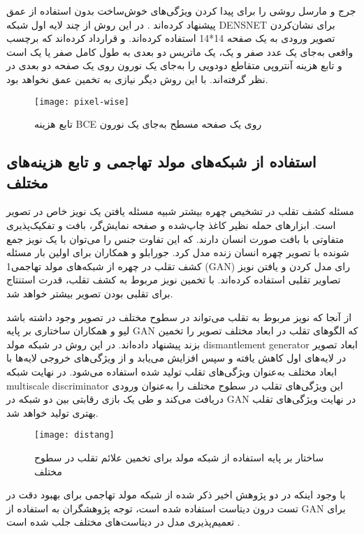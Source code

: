  جرج و مارسل روشی را برای پیدا کردن ویژگی‌های خوش‌ساخت بدون استفاده از عمق پیشنهاد کرده‌اند
 \cite{george2019deep}.
 در این روش از چند لایه اول شبکه DENSNET
\cite{huang2017densely}
برای نشان‌کردن تصویر ورودی به یک صفحه 14*14 استفاده کرده‌اند. و قرارداد کرده‌اند که برچسب واقعی به‌جای یک عدد صفر و یک، یک ماتریس دو بعدی به طول کامل صفر یا یک است و تابع هزینه آنتروپی متقاطع دودویی را به‌جای یک نورون روی یک صفحه دو بعدی در نظر گرفته‌اند. با این روش دیگر نیازی به تخمین عمق نخواهد بود.
\begin{figure}[h]
	\centerline{\texttt{[image: pixel-wise]}}
	\caption{تابع هزینه BCE روی یک صفحه مسطح به‌جای یک نورون \cite{george2019deep} }
	\label{fig:pixel-wise}
\end{figure}
\subsection{استفاده از شبکه‌های مولد تهاجمی و تابع هزینه‌های مختلف}
مسئله کشف تقلب در تشخیص چهره بیشتر شبیه مسئله یافتن یک نویز خاص در تصویر است. ابزارهای حمله نظیر کاغذ چاپ‌شده و صفحه نمایش‌گر، بافت و تفکیک‌پذیری متفاوتی با بافت صورت انسان دارند. که این تفاوت جنس را می‌توان با یک نویز جمع شونده با تصویر چهره انسان زنده مدل کرد. جورابلو و همکاران
\cite{jourabloo2018face}
برای اولین بار مسئله کشف تقلب در چهره از شبکه‌های مولد تهاجمی1 (GAN)
\cite{goodfellow2014generative}
رای مدل کردن و یافتن نویز تصاویر تقلبی استفاده کرده‌اند. با تخمین نویز مربوط به کشف تقلب، قدرت استنتاج برای تقلبی بودن تصویر بیشتر خواهد شد.

از آنجا که نویز مربوط به تقلب می‌تواند در سطوح مختلف در تصویر وجود داشته باشد لیو و همکاران
\cite{liu2020disentangling}
ساختاری بر پایه GAN که الگوهای تقلب در ابعاد مختلف تصویر را تخمین بزند پیشنهاد داده‌اند. در این روش در شبکه مولد dismantlement generator ابعاد تصویر در لایه‌های اول کاهش یافته و سپس افزایش می‌یابد و از ویژگی‌های خروجی لایه‌ها با ابعاد مختلف به‌عنوان ویژگی‌های تقلب تولید شده استفاده می‌شود. در نهایت شبکه multiscale discriminator این ویژگی‌های تقلب در سطوح مختلف را به‌عنوان ورودی دریافت می‌کند و طی یک بازی رقابتی بین دو شبکه در GAN در نهایت ویژگی‌های تقلب بهتری تولید خواهد شد. 
\begin{figure}[h]
	\centerline{\texttt{[image: distang]}}
	\caption{ساختار بر پایه استفاده از شبکه مولد برای تخمین علائم تقلب در سطوح مختلف \cite{liu2020disentangling} }
	\label{fig:pixel-wise}
\end{figure}

با وجود اینکه در دو پژوهش اخیر ذکر شده
\cite{jourabloo2018face,liu2020disentangling}
از شبکه مولد تهاجمی برای بهبود دقت در تست درون دیتاست استفاده شده است، توجه پژوهشگران به استفاده از GAN برای تعمیم‌پذیری مدل در دیتاست‌های مختلف جلب شده است
\cite{shao2019multi,jia2020single}.

